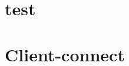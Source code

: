 \documentclass[conference]{IEEEtran}
\begin{document}
\section{test}
%
%

\section{Client-connect}
%

\end{document}
